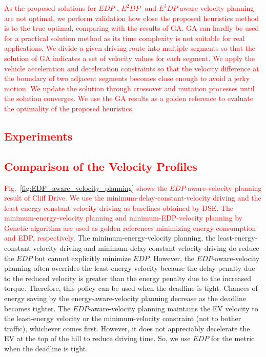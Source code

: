 \documentclass{IEEEtran}
\begin{document}
\textcolor{red}{As the proposed solutions for  $EDP$-, $E^2DP$- and $E^3DP$-aware-velocity planning are not optimal, we perform  validation how close the proposed heuristics method is to the true optimal, comparing with the results of GA. GA can hardly be used for a practical solution method as its time complexity is not suitable for real applications. %
We divide a given driving route into multiple segments so that the solution of GA indicates a set of velocity values for each segment. %
We apply the vehicle acceleration and deceleration constraints so that the velocity difference at the boundary of two adjacent segments becomes close enough to avoid a jerky motion. We update the solution through crossover and mutation processes until the solution converges. We use the GA results as a golden reference to evaluate the optimality of the proposed heuristics.\\
} 


\textcolor{red}{\section{Experiments}\label{sec:experiment}}

\textcolor{red}{\subsection{Comparison of the Velocity Profiles}}

\textcolor{red}{Fig.~\ref{fig:EDP_aware_velocity_planning} shows the $EDP$-aware-velocity planning result of Cliff Drive. We use the minimum-delay-constant-velocity driving and the least-energy-constant-velocity driving as baselines obtained by DSE. The minimum-energy-velocity planning and minimum-EDP-velocity planning by Genetic algorithm are used as golden references minimizing energy consumption and EDP, respectively.}
%
The minimum-energy-velocity planning, the least-energy-constant-velocity driving and minimum-delay-constant-velocity driving do reduce the $EDP$ but cannot explicitly minimize $EDP$. However, the $EDP$-aware-velocity planning often overrides the least-energy velocity because the delay penalty due to the reduced velocity is greater than the energy penalty due to the increased torque. Therefore, this policy can be used when the deadline is tight. Chances of energy saving by the energy-aware-velocity planning decrease as the deadline becomes tighter. 
%
The $EDP$-aware-velocity planning maintains the EV velocity to the least-energy velocity or the minimum-velocity constraint (not to bother traffic), whichever comes first. However, it does not appreciably decelerate the EV at the top of the hill to reduce driving time. So, we use $EDP$ for the metric when the deadline is tight. 
\end{document}
